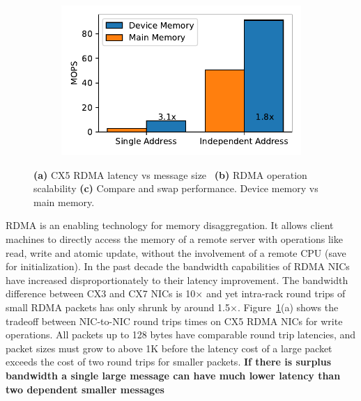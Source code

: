 \begin{figure}[t]
    \begin{subfigure}{0.3\linewidth}
        \includegraphics[width=0.99\linewidth]{fig/rdma_cas_throughput.pdf}
    \end{subfigure}
    \vspace{-1em}
    \caption{
    \textbf{(a)} CX5 RDMA latency vs message size~\cite{rdma-latency}
    \textbf{(b)} RDMA operation scalability
    \textbf{(c)} Compare and swap performance. Device memory vs main memory.
    }
    \label{fig:rdma-benchmarks}
\end{figure}

RDMA is an enabling technology for memory disaggregation. It
allows client machines to directly access the memory of a
remote server with operations like read, write and atomic
update, without the involvement of a remote CPU (save for
initialization).  
In the past decade the bandwidth
capabilities of RDMA NICs have increased disproportionately
to their latency improvement. The bandwidth difference
between CX3 and CX7 NICs is 10$\times$ and yet intra-rack
round trips of small RDMA packets has only shrunk by around
1.5$\times$.  Figure~\ref{fig:rdma-benchmarks}(a) shows the
tradeoff between NIC-to-NIC round trips times on CX5 RDMA
NICs for write operations. All packets up to 128 bytes have
comparable round trip latencies, and packet sizes must grow
to above 1K before the latency cost of a large packet
exceeds the cost of two round trips for smaller packets.
\textbf{If there is surplus bandwidth a single large message
can have much lower latency than two dependent smaller
messages}

